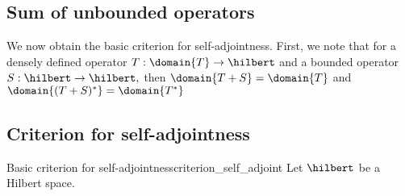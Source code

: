 \subsection{Sum of unbounded operators}
We now obtain the basic criterion for self-adjointness. First, we note that for a densely defined operator \(T : \domain{T} \to \hilbert\) and a bounded operator \(S : \hilbert \to \hilbert,\) then \(\domain{T + S} = \domain{T}\) and \(\domain{(T + S)^*} = \domain{T^*}\)

\subsection{Criterion for self-adjointness}
\begin{theorem}{Basic criterion for self-adjointness}{criterion_self_adjoint}
    Let \(\hilbert\) be a Hilbert space.
\end{theorem}
